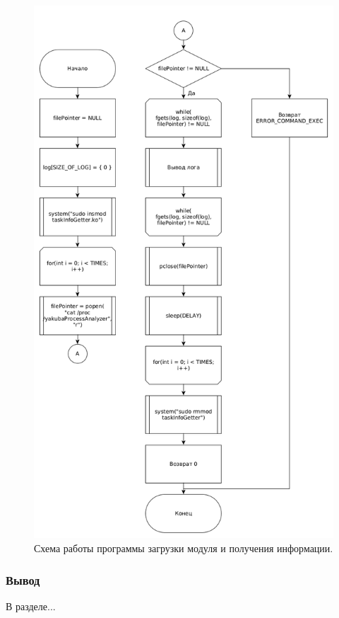 \begin{figure}[H]
	\centering
	\includegraphics[scale=0.5]{img/starterLogger.png}
	\caption{Схема работы программы загрузки модуля и получения информации. }
	\label{fig:starterLogger}
\end{figure}

\subsubsection*{Вывод}
В разделе...

\pagebreak